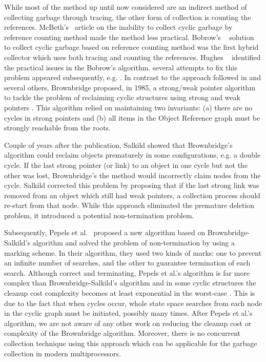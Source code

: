 While most of the method up until now considered are  an indirect method of collecting garbage through tracing, the other form of collection is counting the references. McBeth's~\cite{McBeth1963} article on the inability to collect cyclic garbage  by 
reference counting method made the method less practical. Bobrow's ~\cite{Bobrow1980} solution to collect cyclic garbage based on reference counting method was the first hybrid collector which uses both tracing and
counting the references. Hughes ~\cite{hugh83,hugh87} identified the practical issues in the Bobrow's algorithm.
several attempts to fix this problem appeared subsequently, e.g. \cite{Friedman1979,Bobrow1980,Lins2008}. 
In contrast to the approach followed in \cite{Friedman1979,Bobrow1980,Lins2008} and several others,
Brownbridge \cite{Brownbridge1985} proposed, in 1985, a strong/weak pointer algorithm to tackle the problem of reclaiming cyclic  structures using strong and weak pointers \cite{Jones1996}. 
This algorithm relied on maintaining two invariants: (a) there are no cycles in strong pointers and (b) all items in the Object Reference graph must be strongly reachable from the roots.

Couple of years after the publication, Salkild \cite{Salkild1987} showed that Brownbridge's algorithm
\cite{Brownbridge1985} could reclaim objects prematurely in some
configurations, e.g. a double cycle. If the last strong pointer (or link) to
an object in one cycle but not the other was lost, Brownbridge's
the method would incorrectly claim nodes from the cycle.
Salkild \cite{Salkild1987} corrected this problem by proposing
that if the last strong link was removed from an object which still
had weak pointers, a collection process should re-start from that node.
While this approach eliminated the premature deletion problem, it introduced a
potential non-termination problem.

Subsequently, Pepels et al.~\cite{Pepels1988} proposed a new algorithm based on
Brownbridge-Salkild's algorithm and solved the problem of non-termination by
using a marking scheme. In their algorithm, they used two kinds of marks: one to
prevent an infinite number of searches, and the other to guarantee termination
of each search. Although correct and terminating, Pepels et al.'s algorithm is far more
complex than Brownbridge-Salkild's algorithm and in some cyclic structures the
cleanup cost complexity becomes at least
exponential in the worst-case \cite{Jones1996}. This is due to the fact that when
cycles occur, whole state space searches from
each node in the cyclic graph must be initiated, possibly many times. After Pepels et al.'s algorithm, we are not aware
of any other work on reducing the cleanup cost or complexity of the Brownbridge
algorithm. Moreover, there is no concurrent collection technique using this approach which can be applicable for the garbage collection in modern multiprocessors.

